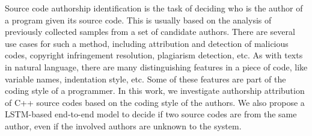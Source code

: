 Source code authorship identification is the task of deciding who is the author of a program given its source code. This is usually based on the analysis of previously collected samples from a set of candidate authors. There are several use cases for such a method, including attribution and detection of malicious codes, copyright infringement resolution, plagiarism detection, etc. As with texts in natural language, there are many distinguishing features in a piece of code, like variable names, indentation style, etc. Some of these features are part of the coding style of a programmer. In this work, we investigate authorship attribution of C++ source codes based on the coding style of the authors. We also propose a LSTM-based end-to-end model to decide if two source codes are from the same author, even if the involved authors are unknown to the system.